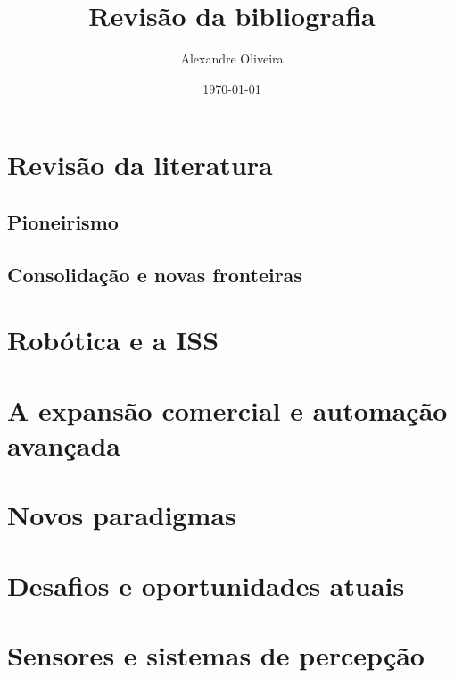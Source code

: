\documentclass[a4paper,12pt]{article}
\begin{document}
\title{Revisão da bibliografia}
\author{Alexandre Oliveira}
\date{\today}
\maketitle

\section{Revisão da literatura}

\subsection{Pioneirismo}



\subsection{Consolidação e novas fronteiras}


\section{Robótica e a ISS}



\section{A expansão comercial e automação avançada}



\section{Novos paradigmas}



\section{Desafios e oportunidades atuais}



\section{Sensores e sistemas de percepção}
\end{document}
